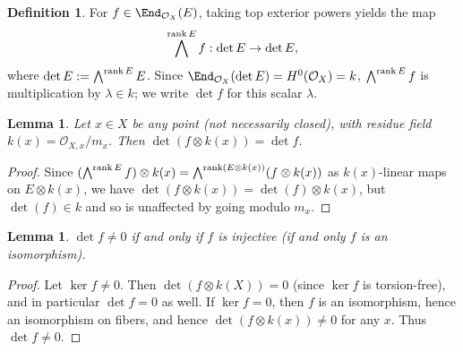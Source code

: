 \documentclass[12pt]{article}
\let\l\lambda
\def\OO{\mathcal O}
\theoremstyle{theorem}
\numberwithin{thm}{section}
\newtheorem{lem}[thm]{Lemma}
\theoremstyle{definition}
\newtheorem{dfn}[thm]{Definition}
\begin{document}

\begin{dfn}
For $f\in \End_{\OO_X}(E)$, taking top exterior powers yields the map
$$ \bigwedge^{\operatorname{rank} E} f: \det E  \to \det E, $$
where $\det E := \bigwedge^{\operatorname{rank} E} E$.
Since $\End_{\OO_X}(\det E) = H^0(\OO_X)=k$, $\bigwedge^{\operatorname{rank} E} f$ is multiplication by $\l\in k$; we write $\det f$ for this scalar $\l$.
\end{dfn}

\begin{lem}
Let $x \in X$ be any point (not necessarily closed), with residue field $k(x) = \OO_{X,x}/m_x$. Then $\det(f\otimes k(x)) =\det f$.
\end{lem}

\begin{proof}
Since $(\bigwedge^{\operatorname{rank} E} f)\otimes k(x) = \bigwedge^{\operatorname{rank}( E\otimes k(x))}( f\otimes k(x))$ as $k(x)$-linear maps on $E\otimes k(x)$,
 we have $\det(f\otimes k(x)) =\det(f)\otimes k(x)$, but $\det(f)\in k$ and so is unaffected by going modulo $m_x$.
\end{proof}



\begin{lem}
$\det f \neq 0 $ if and only if $f$ is injective (if and only $f$ is an isomorphism).
\end{lem}

\begin{proof}
  Let $\ker f \neq 0$. %
 Then $\det(f\otimes k(X))= 0$ (since $\ker f$ is torsion-free), and in particular  $\det f = 0$ as well.
If $\ker f = 0$, then
$f$ is an isomorphism, hence an isomorphism on fibers, and hence
$\det(f\otimes k(x)) \neq 0$ for any $x$. Thus $\det f\neq 0$.
\end{proof}
\end{document}

